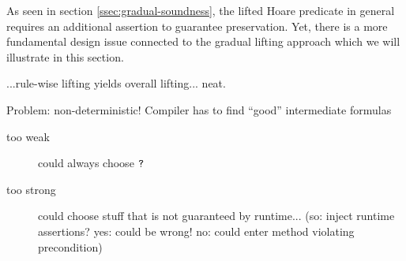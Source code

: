 
As seen in section \ref{ssec:gradual-soundness}, the lifted Hoare predicate in general requires an additional assertion to guarantee preservation.
Yet, there is a more fundamental design issue connected to the gradual lifting approach which we will illustrate in this section.

...rule-wise lifting yields overall lifting... neat.

Problem: non-deterministic! Compiler has to find “good” intermediate formulas
\begin{description}
    \item[too weak] could always choose $\texttt{?}$
    \item[too strong] could choose stuff that is not guaranteed by runtime... (so: inject runtime assertions? yes: could be wrong! no: could enter method violating precondition)
\end{description}
